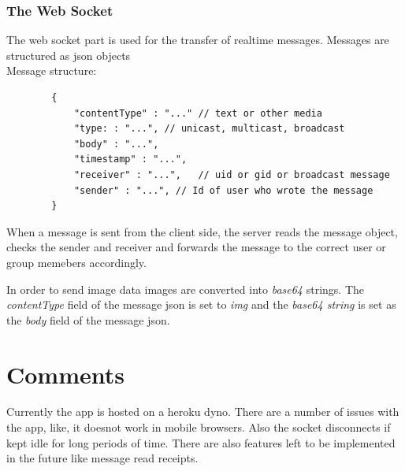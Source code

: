 \documentclass[titlepage]{article}
\begin{document}
    \subsubsection{The Web Socket}
    The web socket part is used for the transfer of realtime messages.
    Messages are structured as json objects\\
    Message structure:
    \begin{verbatim}
        {
            "contentType" : "..." // text or other media
            "type: : "...", // unicast, multicast, broadcast
            "body" : "...",
            "timestamp" : "...",
            "receiver" : "...",   // uid or gid or broadcast message
            "sender" : "...", // Id of user who wrote the message
        }
    \end{verbatim}

    When a message is sent from the client side, the server reads the message object, checks the sender and receiver and
    forwards the message to the correct user or group memebers accordingly.


    In order to send image data images are converted into \emph{base64} strings.
    The \textit{contentType} field of the message json is set to \emph{img} and
    the \emph{base64 string} is set as the \textit{body} field of the message json.

    \section{Comments}
    Currently the app is hosted on a heroku dyno.
    There are a number of issues with the app, like, it doesnot work in mobile browsers.
    Also the socket disconnects if kept idle for long periods of time.
    There are also features left to be implemented in the future like message read receipts.
\end{document}
